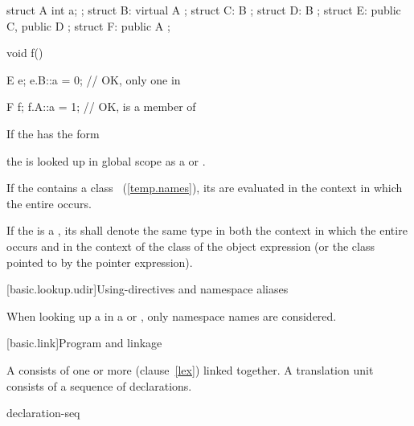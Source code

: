\begin{codeblock}
struct A {
	int a;
};
struct B: virtual A { };
struct C: B { };
struct D: B { };
struct E: public C, public D { };
struct F: public A { };

void f() {
	E e;
	e.B::a = 0;		// OK, only one  in 

	F f;
	f.A::a = 1;		// OK,  is a member of 
}
\end{codeblock}

\exitnoteb

\pnum
If the  has the form

\begin{indented}
\end{indented}

the  is looked up in global scope
as a  or .

\pnum
If the  contains a class
~(\ref{temp.names}), its
 are evaluated in the context in which the
entire  occurs.

\pnum
If the  is a ,
its  shall denote the same type in both
the context in which the entire  occurs
and in the context of the class of the object expression (or the class
pointed to by the pointer expression).

[basic.lookup.udir]{Using-directives and namespace aliases}

\pnum
{}%
%
When looking up a  in a
 or ,
only namespace names are considered.%
%

[basic.link]{Program and linkage}%

\pnum
{}%
A  consists of one or more  (clause~\ref{lex}) linked together. A translation unit consists
of a sequence of declarations.

\begin{bnf}
\br
    declaration-seq\opt
\end{bnf}

